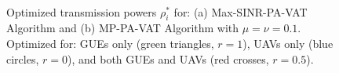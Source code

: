 \begin{figure}[!t]
\centering
{}
\hspace{0mm}\\
\vspace*{3mm}
\captionsetup{justification=justified}
\caption{Optimized transmission powers $\rho_i^*$ for: (a) Max-SINR-PA-VAT Algorithm and (b) MP-PA-VAT Algorithm with $\mu =\nu = 0.1$. Optimized for: GUEs only (green triangles, $r=1$), UAVs only (blue circles, $r=0$), and both GUEs and UAVs (red crosses, $r=0.5$).}
\label{TWC-Optimal-Power}
\end{figure}





